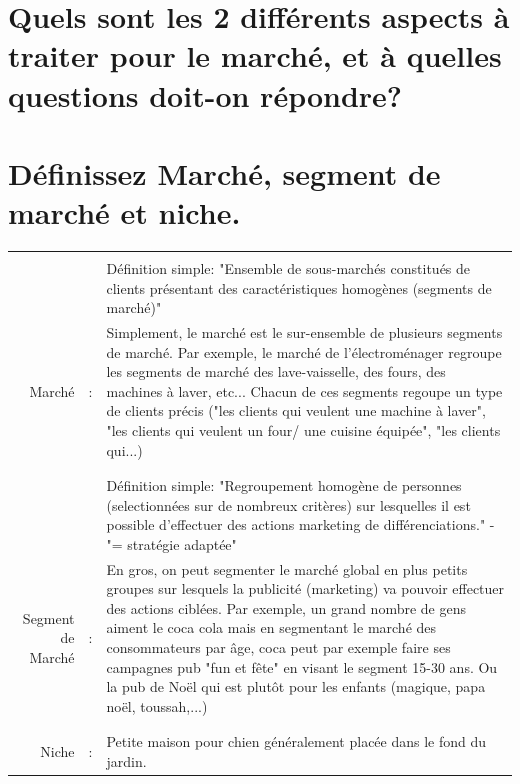 \documentclass{article}
\begin{document}
\section{Quels sont les 2 différents aspects à traiter pour le marché, et à quelles questions doit-on répondre?}

\section{Définissez Marché, segment de marché et niche.}
\begin{tabular}{|rcl|}
\hline
&&\\
&& \multicolumn{1}{p{.8\textwidth}|}{Définition simple: "Ensemble de sous-marchés constitués de clients présentant des caractéristiques homogènes (segments de marché)"}\\
Marché & : & \multicolumn{1}{p{.8\textwidth}|}{Simplement, le marché est le sur-ensemble de plusieurs segments de marché. Par exemple, le marché de l'électroménager regroupe les segments de marché des lave-vaisselle, des fours, des machines à laver, etc... Chacun de ces segments regoupe un type de clients précis ("les clients qui veulent une machine à laver", "les clients qui veulent un four/ une cuisine équipée", "les clients qui...)}\\
&&\\
\hline
&&\\
&& \multicolumn{1}{p{.8\textwidth}|}{Définition simple: "Regroupement homogène de personnes (selectionnées sur de nombreux critères) sur lesquelles il est possible d'effectuer des actions marketing de différenciations." - "= stratégie adaptée"}\\
Segment de Marché & : & \multicolumn{1}{p{.8\textwidth}|}{En gros, on peut segmenter le marché global en plus petits groupes sur lesquels la publicité (marketing) va pouvoir effectuer des actions ciblées. Par exemple, un grand nombre de gens aiment le coca cola mais en segmentant le marché des consommateurs par âge, coca peut par exemple faire ses campagnes pub "fun et fête" en visant le segment 15-30 ans. Ou la pub de Noël qui est plutôt pour les enfants (magique, papa noël, toussah,...)}\\
&&\\
\hline
&&\\
Niche & : & \multicolumn{1}{p{.8\textwidth}|}{Petite maison pour chien généralement placée dans le fond du jardin.}\\

\end{tabular}
\end{document}
